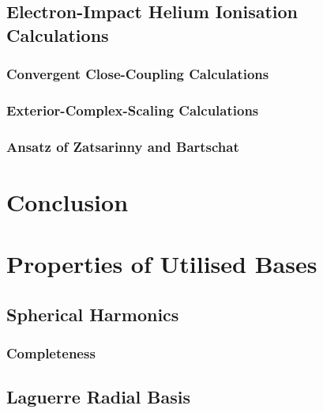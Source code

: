 \documentclass[draft]{article}
\begin{document}
\subsection{Electron-Impact Helium Ionisation Calculations}
\label{sec:e-he-ionisation-calculations}

\subsubsection{Convergent Close-Coupling Calculations}
\label{sec:e-he-ccc-calculations}

\subsubsection{Exterior-Complex-Scaling Calculations}
\label{sec:e-he-ecs-calculations}

\subsubsection{Ansatz of Zatsarinny and Bartschat}
\label{sec:e-he-ecs-calculations}

\section{Conclusion}
\label{sec:conclusion}

\clearpage





\clearpage

\appendix

\section{Properties of Utilised Bases}
\label{app:properties}

\subsection{Spherical Harmonics}
\label{app:spherical-harmonics}

\subsubsection{Completeness}
\label{app:spherical-harmonic-completeness}

\subsection{Laguerre Radial Basis}
\label{app:laguerre-radial-basis}
\end{document}
